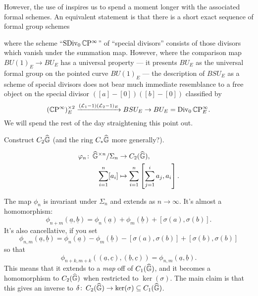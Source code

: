 However, the use of  inspires us to spend a moment longer with the associated formal schemes.  An equivalent statement is that there is a short exact sequence of formal group schemes
\begin{center}
\end{center}
where the scheme ``$\operatorname{SDiv}_0 \mathbb{C}\mathrm P^\infty$'' of ``special divisors'' consists of those divisors which vanish under the summation map.  However, where the comparison map $BU(1)_E \to BU_E$ has a universal property --- it presents $BU_E$ as the universal formal group on the pointed curve $BU(1)_E$ --- the description of $BSU_E$ as a scheme of special divisors does not bear much immediate resemblance to a free object on the special divisor $([a] - [0])([b] - [0])$ classified by \[(\mathbb{C}\mathrm P^\infty)^{\times 2}_E \xrightarrow{(\mathcal{L}_1 - 1)(\mathcal{L}_2 - 1)_E} BSU_E \to BU_E = \operatorname{Div}_0 \mathbb{C}\mathrm P^\infty_E.\]  We will spend the rest of the day straightening this point out.








Construct $C_2 \widehat{\mathbb G}$ (and the ring $C_* \widehat{\mathbb G}$ more generally?).



\begin{align*}
\varphi_n \colon\thinspace \widehat{\mathbb G}^{\times n} / \Sigma_n & \to C_2(\widehat{\mathbb G}), \\
\sum_{i=1}^n [a_i] & \mapsto \sum_{i=1}^n \left[\sum_{j=1}^i a_j, a_i \right].
\end{align*}

 The map $\phi_n$ is invariant under $\Sigma_n$ and extends as $n \to \infty$.   It's almost a homomorphism: \[\phi_{n+m}(\underline a, \underline b) = \phi_n(\underline a) + \phi_m(\underline b) + [\sigma(a), \sigma(b)].\]   It's also cancellative, if you set \[\phi_{n, m}(\underline a, \underline b) = \phi_n(\underline a) - \phi_m(\underline b) - [\sigma(a), \sigma(b)] + [\sigma(b), \sigma(b)]\] so that \[\phi_{n+k,m+k}((\underline a, \underline c), (\underline b, \underline c)) = \phi_{n,m}(\underline a, \underline b).\]  This means that it extends to a \emph{map} off of $C_1(\widehat{\mathbb G})$, and it becomes a homomorphism to $C_2(\widehat{\mathbb G})$ when restricted to $\ker(\sigma)$.  The main claim is that this gives an inverse to $\delta\colon\thinspace C_2(\widehat{\mathbb G}) \to \ker(\sigma) \subseteq C_1(\widehat{\mathbb G})$.











